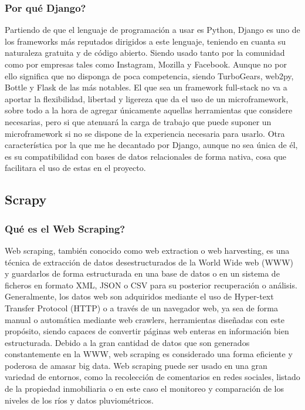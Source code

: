 \subsubsection{Por qué Django?}
Partiendo de que el lenguaje de programación a usar es Python, Django es uno de los frameworks más reputados dirigidos a este lenguaje, teniendo en cuanta su naturaleza gratuita y de código abierto. Siendo usado tanto por la comunidad como por empresas tales como Instagram, Mozilla y Facebook. Aunque no por ello significa que no disponga de poca competencia, siendo TurboGears, web2py, Bottle y Flask de las más notables.
\newline
\newline
El que sea un framework full-stack no va a aportar la flexibilidad, libertad y ligereza que da el uso de un microframework, sobre todo a la hora de agregar únicamente aquellas herramientas que considere necesarias, pero si que atenuará la carga de trabajo que puede suponer un microframework si no se dispone de la experiencia necesaria para usarlo.
\newline
\newline
Otra característica por la que me he decantado por Django, aunque no sea única de él, es su compatibilidad con bases de datos relacionales de forma nativa, cosa que facilitara el uso de estas en el proyecto.

\newpage

\subsection{Scrapy}

\subsubsection{Qué es el Web Scraping?}
Web scraping, también conocido como web extraction o web harvesting, es una técnica de extracción de datos desestructurados de la World Wide web (WWW) y guardarlos de forma estructurada en una base de datos o en un sistema de ficheros en formato XML, JSON o CSV para su posterior recuperación o análisis. Generalmente, los datos web son adquiridos mediante el uso de Hyper-text Transfer Protocol (HTTP) o a través de un navegador web, ya sea de forma manual o automática mediante web crawlers, herramientas diseñadas con este propósito, siendo capaces de convertir páginas web enteras en información bien estructurada.
\newline
\newline
Debido a la gran cantidad de datos que son generados constantemente en la WWW, web scraping es considerado una forma eficiente y poderosa de amasar big data.
\newline
\newline
Web scraping puede ser usado en una gran variedad de entornos, como la recolección de comentarios en redes sociales, listado de la propiedad inmobiliaria o en este caso el monitoreo y comparación de los niveles de los ríos y datos pluviométricos.

